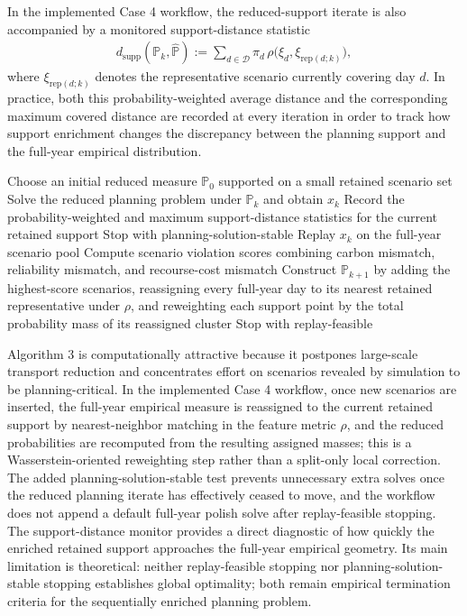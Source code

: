 In the implemented Case 4 workflow, the reduced-support iterate is also accompanied by a monitored support-distance statistic
\begin{align}
d_{\mathrm{supp}}(\mathbb{P}_k,\widehat{\mathbb{P}})
:= \sum_{d\in\mathcal{D}} \pi_d \, \rho\big(\xi_d,\xi_{\mathrm{rep}(d;k)}\big),
\label{eq:10a-support-monitor-distance}
\end{align}
where \(\xi_{\mathrm{rep}(d;k)}\) denotes the representative scenario currently covering day \(d\). In practice, both this probability-weighted average distance and the corresponding maximum covered distance are recorded at every iteration in order to track how support enrichment changes the discrepancy between the planning support and the full-year empirical distribution.

\begin{algorithmic}[1]
\State Choose an initial reduced measure \(\mathbb{P}_0\) supported on a small retained scenario set
  \State Solve the reduced planning problem under \(\mathbb{P}_k\) and obtain \(x_k\)
  \State Record the probability-weighted and maximum support-distance statistics for the current retained support
    \State Stop with planning-solution-stable
  \EndIf
  \State Replay \(x_k\) on the full-year scenario pool
  \State Compute scenario violation scores combining carbon mismatch, reliability mismatch, and recourse-cost mismatch
  \State Construct \(\mathbb{P}_{k+1}\) by adding the highest-score scenarios, reassigning every full-year day to its nearest retained representative under \(\rho\), and reweighting each support point by the total probability mass of its reassigned cluster
    \State Stop with replay-feasible
  \EndIf
\EndFor
\end{algorithmic}

Algorithm 3 is computationally attractive because it postpones large-scale transport reduction and concentrates effort on scenarios revealed by simulation to be planning-critical. In the implemented Case 4 workflow, once new scenarios are inserted, the full-year empirical measure is reassigned to the current retained support by nearest-neighbor matching in the feature metric \(\rho\), and the reduced probabilities are recomputed from the resulting assigned masses; this is a Wasserstein-oriented reweighting step rather than a split-only local correction. The added planning-solution-stable test prevents unnecessary extra solves once the reduced planning iterate has effectively ceased to move, and the workflow does not append a default full-year polish solve after replay-feasible stopping. The support-distance monitor provides a direct diagnostic of how quickly the enriched retained support approaches the full-year empirical geometry. Its main limitation is theoretical: neither replay-feasible stopping nor planning-solution-stable stopping establishes global optimality; both remain empirical termination criteria for the sequentially enriched planning problem.

